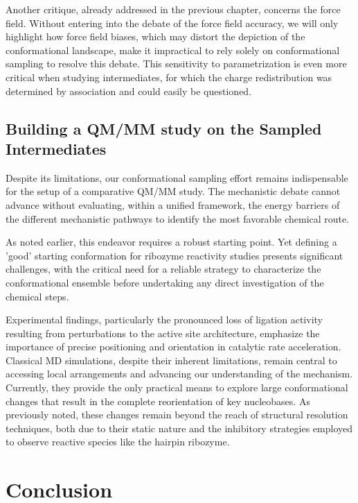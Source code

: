 \documentclass[journal=jacsat,manuscript=article]{achemso}
\begin{document}
Another critique, already addressed in the previous chapter, concerns the force field.
Without entering into the debate of the force field accuracy, we will only highlight how force field biases, 
which may distort the depiction of the conformational landscape,
make it impractical to rely solely on conformational sampling to resolve this debate.
This sensitivity to parametrization is even more critical when studying intermediates,
for which the charge redistribution was determined by association and could easily be questioned.


\subsection{Building a QM/MM study on the Sampled Intermediates}

Despite its limitations, our conformational sampling effort remains indispensable for the setup of a comparative QM/MM study.
The mechanistic debate cannot advance without evaluating, within a unified framework,
the energy barriers of the different mechanistic pathways to identify the most favorable chemical route.

As noted earlier, this endeavor requires a robust starting point.
Yet defining a 'good' starting conformation for ribozyme reactivity studies presents significant challenges,
with the critical need for a reliable strategy
to characterize the conformational ensemble before undertaking any direct investigation of the chemical steps.

Experimental findings, particularly the pronounced loss of ligation activity resulting from perturbations
to the active site architecture, emphasize the importance of precise positioning and orientation
in catalytic rate acceleration.
Classical MD simulations, despite their inherent limitations, remain central to accessing local arrangements
and advancing our understanding of the mechanism.
Currently, they provide the only practical means to explore large conformational changes 
that result in the complete reorientation of key nucleobases.
As previously noted, these changes remain beyond the reach of structural resolution techniques,
both due to their static nature and the inhibitory strategies employed
to observe reactive species like the hairpin ribozyme.

\section{Conclusion}
\end{document}
